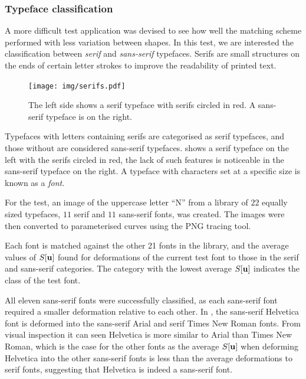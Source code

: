 \documentclass[a4paper, 12pt]{article}
\begin{document}
\subsubsection{Typeface classification \label{sec:fonts}}
A more difficult test application was devised to see how well the matching
scheme performed with less variation between shapes. In this test, we are
interested the classification between \emph{serif} and
\emph{sans-serif} typefaces. Serifs are small structures on the ends of certain letter
strokes to improve the readability of printed text. 

\begin{figure}[h!]
  \centering
  \texttt{[image: img/serifs.pdf]}
  \caption[Example of serif and sans-serif typefaces]{The left side shows a serif typeface with serifs circled in red. A
    sans-serif typeface is on the right.}
\label{fig:serif-demo}
\end{figure}

Typefaces with letters containing serifs are categorised as serif typefaces, and
those without are considered sans-serif typefaces.  shows a
serif typeface on the left with the serifs circled in red, the lack of such
features is noticeable in the sans-serif typeface on the right. A typeface with
characters set at a specific size is known as a \emph{font}.

For the test, an image of the uppercase letter ``N'' from a library of $22$
equally sized typefaces, $11$ serif and $11$ sans-serif fonts, was created. The
images were then converted to parameterised curves using the PNG tracing tool.


Each font is matched against the other 21 fonts in the library, and the
average values of $S[\mathbf{u}]$ found for deformations of the current test font
to those in the serif and sans-serif categories. The category with the lowest
average $S[\mathbf{u}]$ indicates the class of the test font.

All eleven sans-serif fonts were successfully classified, as each sans-serif font
required a smaller deformation relative to each other. In , the
sans-serif Helvetica font is deformed into the sans-serif Arial and serif Times New Roman
fonts. From visual inspection it can seen Helvetica is more similar to Arial
than Times New Roman, which is the case for the other fonts as the average
$S[\mathbf{u}]$
when deforming Helvetica into the other sans-serif fonts is less than the
average deformations to serif fonts, suggesting that Helvetica is indeed a
sans-serif font.
\end{document}
